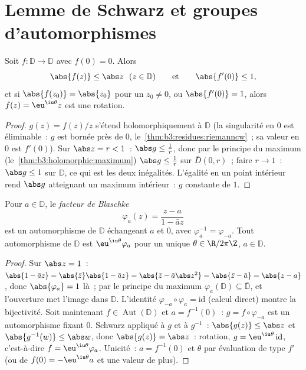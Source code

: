 \section{Lemme de Schwarz et groupes d'automorphismes}

\begin{theorem}\label{thm:b3:conformal:schwarz}
Soit $f \colon \mathbb D \to \mathbb D$  avec
$f(0) = 0$. Alors
\[
\abs{f(z)} \leq \abs z \ \ (z \in \mathbb D)
\qquad\text{et}\qquad \abs{f'(0)} \leq 1 ,
\]
et si $\abs{f(z_0)} = \abs{z_0}$ pour un $z_0 \neq 0$, ou
$\abs{f'(0)} = 1$, alors $f(z) = \eu^{\iu\theta}z$ est une
rotation.
\end{theorem}

\begin{proof}
$g(z) = f(z)/z$ s'étend holomorphiquement à $\mathbb D$ (la
singularité en $0$ est éliminable~: $g$ est bornée près de
$0$, le~\cref{thm:b3:residues:riemanncw}~; sa valeur en $0$
est $f'(0)$). Sur $\abs z = r < 1$~: $\abs g \leq \frac1r$,
donc par le principe du maximum
(le~\cref{thm:b3:holomorphic:maximum}) $\abs g \leq \frac1r$
sur $\bar D(0,r)$~; faire $r \to 1$~: $\abs g \leq 1$ sur
$\mathbb D$, ce qui est les deux inégalités. L'égalité en un
point intérieur rend $\abs g$ atteignant un maximum
intérieur~: $g$ constante de  $1$.
\end{proof}

\begin{theorem}
\label{thm:b3:conformal:autdisc}
Pour $a \in \mathbb D$, le \emph{facteur de
Blaschke}
\[
\varphi_a(z) = \frac{z - a}{1 - \bar a z}
\]
est un automorphisme de $\mathbb D$ échangeant $a$ et $0$,
avec $\varphi_a^{-1} = \varphi_{-a}$. Tout automorphisme de
$\mathbb D$ est $\eu^{\iu\theta}\varphi_a$ pour un unique
$\theta \in \R/2\pi\Z$, $a \in \mathbb D$.
\end{theorem}

\begin{proof}
Sur $\abs z = 1$~: $\abs{1 - \bar az} = \abs{\bar z}\abs{1 -
\bar az} = \abs{\bar z - \bar a\abs z^2} = \abs{\bar z - \bar
a} = \abs{z - a}$, donc $\abs{\varphi_a} = 1$ là~; par le
principe du maximum $\varphi_a(\mathbb D) \subseteq
\bar{\mathbb D}$, et l'ouverture met l'image dans $\mathbb
D$. L'identité  $\varphi_{-a}\circ\varphi_a =
\mathrm{id}$ (calcul direct) montre la bijectivité. Soit
maintenant $f \in \operatorname{Aut}(\mathbb D)$ et $a =
f^{-1}(0)$~: $g = f\circ\varphi_{-a}$ est un automorphisme
fixant $0$. Schwarz appliqué à $g$ et à $g^{-1}$~:
$\abs{g(z)} \leq \abs z$ et $\abs{g^{-1}(w)} \leq \abs w$,
donc $\abs{g(z)} = \abs z$~: rotation, $g =
\eu^{\iu\theta}\,\mathrm{id}$, c'est-à-dire $f =
\eu^{\iu\theta}\varphi_a$. Unicité~: $a = f^{-1}(0)$ et
$\theta$ par évaluation de type $f'$ (ou de $f(0) =
-\eu^{\iu\theta}a$ et une valeur de plus).
\end{proof}

